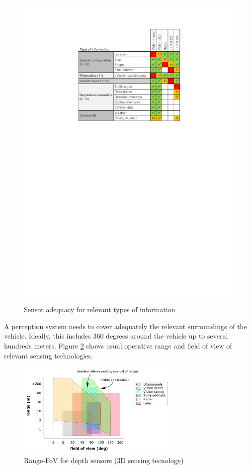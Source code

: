 \begin{figure}[h]
    \centering
    \includegraphics[width=0.95\linewidth]{"img/information_types_sensors"}
    \caption{Sensor adequacy for relevant types of information}
    \label{fig:information_vs_sensors}
\end{figure}

A perception system needs to cover adequately the relevant surroundings of the
vehicle. Ideally, this includes 360 degrees around the vehicle up to several
hundreds meters. Figure \ref{fig:range-fov} shows usual operative range and
field of view of relevant sensing technologies. 

\begin{figure}[h]
    \centering
    \includegraphics[width=0.7\textwidth]{"img/plot_range-fov"}
    \caption{Range-FoV for depth sensors (3D sensing tecnology)}
    \label{fig:range-fov}
\end{figure}

